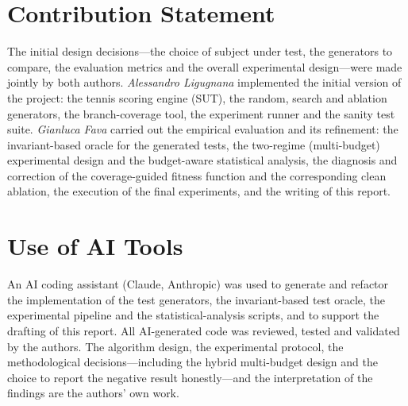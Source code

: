 \documentclass[conference]{IEEEtran}
\begin{document}
\section*{Contribution Statement}
The initial design decisions---the choice of subject under test, the generators
to compare, the evaluation metrics and the overall experimental design---were
made jointly by both authors.
\emph{Alessandro Ligugnana} implemented the initial version of the project: the
tennis scoring engine (SUT), the random, search and ablation generators, the
branch-coverage tool, the experiment runner and the sanity test suite.
\emph{Gianluca Fava} carried out the empirical evaluation and its refinement:
the invariant-based oracle for the generated tests, the two-regime
(multi-budget) experimental design and the budget-aware statistical analysis,
the diagnosis and correction of the coverage-guided fitness function and the
corresponding clean ablation, the execution of the final experiments, and the
writing of this report.

\section*{Use of AI Tools}
An AI coding assistant (Claude, Anthropic) was used to generate and refactor the
implementation of the test generators, the invariant-based test oracle, the
experimental pipeline and the statistical-analysis scripts, and to support the
drafting of this report. All AI-generated code was reviewed, tested and
validated by the authors. The algorithm design, the experimental protocol, the
methodological decisions---including the hybrid multi-budget design and the
choice to report the negative result honestly---and the interpretation of the
findings are the authors' own work.



\end{document}
